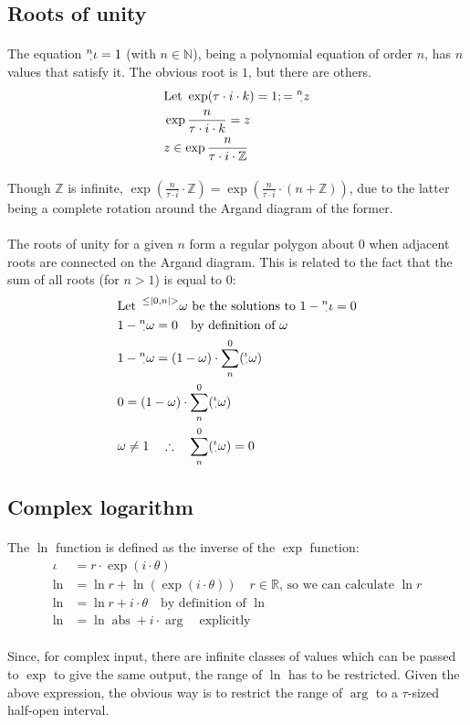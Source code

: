 \documentclass[11pt]{article}
\newcommand*\R{\ensuremath{\mathbb R}}
\newcommand*\id{\iota}
\newcommand*\cd{\cdot}
\newcommand*\prg{\paragraph}
\newcommand*\pt{\prescript}
\DeclareMathOperator{\abs}{abs}
\begin{document}
\subsection{Roots of unity}
\prg{}The equation $\pt n\cd\id=1$ (with $n\in\mathbb N$), being a polynomial equation of order $n$, has $n$ values that satisfy it. The obvious root is $1$, but there are others.
\[
\begin{aligned}
&\textrm{Let }\exp(\tau\cd i\cd k)=1;=\pt n\cd z \\
&\exp\frac{n}{\tau\cd i\cd k}=z \\
&z\in\exp\frac{n}{\tau\cd i\cd\mathbb Z} \\
\end{aligned}
\]
\prg{}Though $\mathbb Z$ is infinite, $\exp(\frac{n}{\tau\cd i}\cd\mathbb Z)=\exp(\frac{n}{\tau\cd i}\cd(n+\mathbb Z))$, due to the latter being a complete rotation around the Argand diagram of the former.

\prg{}The roots of unity for a given $n$ form a regular polygon about $0$ when adjacent roots are connected on the Argand diagram. This is related to the fact that the sum of all roots (for $n>1$) is equal to $0$:
\[
\begin{aligned}
&\textrm{Let }\pt{\leq|0,n|>}{\cd}\omega\textrm{ be the solutions to }1-\pt n\cd\id=0 \\
&1-\pt n\cd\omega=0 \quad\textrm{by definition of }\omega \\
&1-\pt n\cd\omega=(1-\omega)\cd\sum^0_n(\pt\id\cd\omega) \\
&0=(1-\omega)\cd\sum^0_n(\pt\id\cd\omega) \\
&\omega\neq 1\quad\therefore\quad\sum^0_n(\pt\id\cd\omega)=0
\end{aligned}
\]

\subsection{Complex logarithm}
\prg{}The $\ln$ function is defined as the inverse of the $\exp$ function:
\[
\begin{aligned}
\id&=r\cd\exp(i\cd\theta) \\
\ln&=\ln r+\ln(\exp(i\cd\theta)) \quad r\in\R\textrm{, so we can calculate }\ln r \\
\ln&=\ln r+i\cd\theta \quad\textrm{by definition of }\ln \\
\ln&=\ln\abs+i\cd\arg \quad\textrm{explicitly}
\end{aligned}
\]
\prg{}Since, for complex input, there are infinite classes of values which can be passed to $\exp$ to give the same output, the range of $\ln$ has to be restricted. Given the above expression, the obvious way is to restrict the range of $\arg$ to a $\tau$-sized half-open interval.
\end{document}
